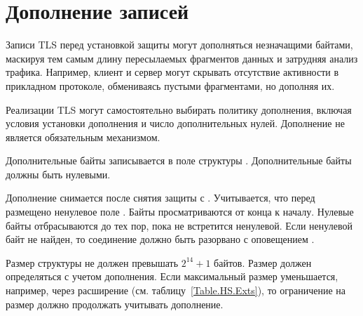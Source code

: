 \section{Дополнение записей}\label{RECORD.Pad}

Записи TLS перед установкой защиты могут дополняться незначащими байтами, 
маскируя тем самым длину пересылаемых фрагментов данных и затрудняя анализ 
трафика. Например, клиент и сервер могут скрывать отсутствие активности в 
прикладном протоколе, обмениваясь пустыми фрагментами, но дополняя их.

Реализации TLS могут самостоятельно выбирать политику дополнения, включая 
условия установки дополнения и число дополнительных нулей. Дополнение не 
является обязательным механизмом.

Дополнительные байты записывается в поле  структуры 
. Дополнительные байты должны быть нулевыми.

Дополнение снимается после снятия защиты с . 
Учитывается, что перед  размещено ненулевое поле .
Байты  просматриваются от конца к началу. Нулевые байты 
отбрасываются до тех пор, пока не встретится ненулевой.
%
Если ненулевой байт не найден, то соединение должно быть разорвано с 
оповещением .

Размер структуры  не должен превышать $2^{14}+1$ байтов. 
Размер должен определяться с учетом дополнения.
%
Если максимальный размер  уменьшается, например, через 
расширение  (см. 
таблицу~\ref{Table.HS.Exts}), то ограничение на размер должно продолжать 
учитывать дополнение. 

